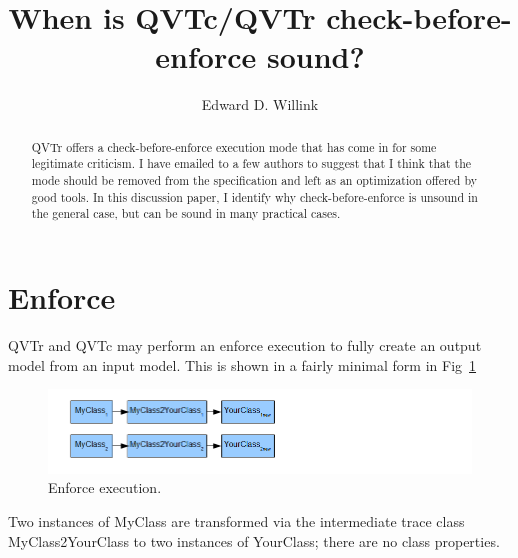 \documentclass{llncs}
\begin{document}
%
\frontmatter          %
%
%
%
\title{When is QVTc/QVTr check-before-enforce sound?}
%
%
\author{Edward D. Willink}
%
%
%

\maketitle              %

\begin{abstract}
QVTr offers a check-before-enforce execution mode that has come in for some legitimate criticism. I have emailed to a few authors to suggest that I think that the mode should be removed from the specification and left as an optimization offered by good tools. In this discussion paper, I identify why check-before-enforce is unsound in the general case, but can be sound in many practical cases.
\end{abstract}
%

\section{Enforce}

QVTr and QVTc may perform an enforce execution to fully create an output model from an input model. This is shown in a fairly minimal form in Fig~\ref{fig:Enforce}

\begin{figure}[h]
	\centering
	\includegraphics[width=1.0\textwidth]{Enforce.png}
	\caption{Enforce execution.}
	\label{fig:Enforce}
\end{figure}

Two instances of MyClass are transformed via the intermediate trace class MyClass2YourClass to two instances of YourClass; there are no class properties.
\end{document}
